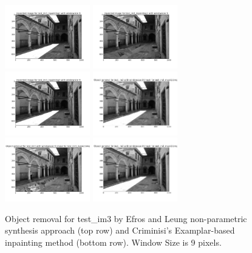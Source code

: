 \documentclass{extarticle}
\theoremstyle{definition}
\theoremstyle{definition}
\begin{document}
\begin{figure}[h!]
	\includegraphics[width = 0.33\textwidth]{./figures/Inpainting_test_im3_inpainting1_size_9.png}	
	\includegraphics[width = 0.33\textwidth]{./figures/Inpainting_test_im3_inpainting2_size_9.png}	
	\includegraphics[width = 0.33\textwidth]{./figures/Inpainting_test_im3_inpainting3_size_9.png}
	\includegraphics[width = 0.33\textwidth]{./figures/Removaltest_im3_size_9_mask1.png}
	\includegraphics[width = 0.33\textwidth]{./figures/Removaltest_im3_size_9_mask2.png}	
	\includegraphics[width = 0.33\textwidth]{./figures/Removaltest_im3_size_9_mask3.png}	
	\caption{Object removal for test\_im3 by Efros and Leung non-parametric synthesis approach (top row) and Criminisi's Examplar-based inpainting method (bottom row). Window Size is 9 pixels.}
	\label{fig_removal}
\end{figure}
\pagebreak
\end{document}
